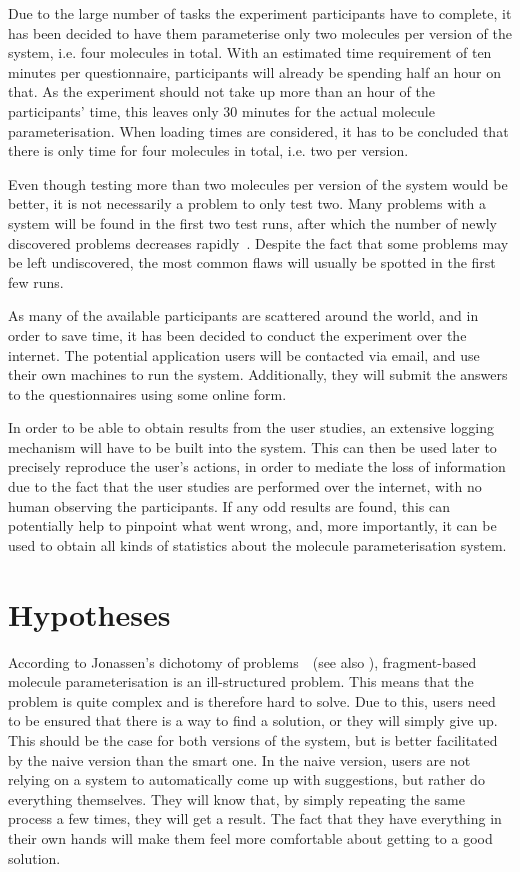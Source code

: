 Due to the large number of tasks the experiment participants have to complete, it has been decided to have them parameterise only two molecules per version of the system, i.e. four molecules in total. With an estimated time requirement of ten minutes per questionnaire, participants will already be spending half an hour on that. As the experiment should not take up more than an hour of the participants' time, this leaves only 30 minutes for the actual molecule parameterisation. When loading times are considered, it has to be concluded that there is only time for four molecules in total, i.e. two per version.

Even though testing more than two molecules per version of the system would be better, it is not necessarily a problem to only test two. Many problems with a system will be found in the first two test runs, after which the number of newly discovered problems decreases rapidly~\cite{krug2006dont, nielsen2000you}. Despite the fact that some problems may be left undiscovered, the most common flaws will usually be spotted in the first few runs.

As many of the available participants are scattered around the world, and in order to save time, it has been decided to conduct the experiment over the internet. The potential application users will be contacted via email, and use their own machines to run the system. Additionally, they will submit the answers to the questionnaires using some online form.

In order to be able to obtain results from the user studies, an extensive logging mechanism will have to be built into the system. This can then be used later to precisely reproduce the user's actions, in order to mediate the loss of information due to the fact that the user studies are performed over the internet, with no human observing the participants. If any odd results are found, this can potentially help to pinpoint what went wrong, and, more importantly, it can be used to obtain all kinds of statistics about the molecule parameterisation system.



\section{Hypotheses}
According to Jonassen's dichotomy of problems~\cite{jonassen2000toward}~(see also ), fragment-based molecule parameterisation is an ill-structured problem. This means that the problem is quite complex and is therefore hard to solve. Due to this, users need to be ensured that there is a way to find a solution, or they will simply give up. This should be the case for both versions of the system, but is better facilitated by the naive version than the smart one. In the naive version, users are not relying on a system to automatically come up with suggestions, but rather do everything themselves. They will know that, by simply repeating the same process a few times, they will get a result. The fact that they have everything in their own hands will make them feel more comfortable about getting to a good solution.

